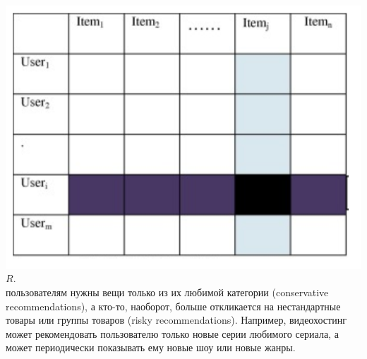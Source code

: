 \documentclass{article}
\newcommand\tab[1][1cm]{\hspace*{#1}}
\begin{document}
 \tab\includegraphics[scale=0.6]{f2.png}\\
  $R$.\\
  пользователям нужны вещи только из их любимой категории (conservative recommendations), а кто-то, наоборот, больше откликается на нестандартные товары или группы товаров (risky recommendations). Например, видеохостинг может рекомендовать пользователю только новые серии любимого сериала, а может периодически показывать ему новые шоу или новые жанры.\\
\end{document}
